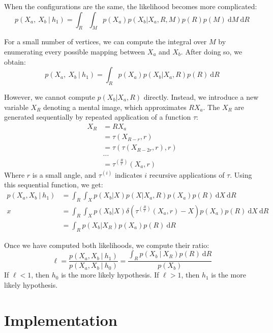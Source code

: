 \documentclass{article} %
\begin{document}
When the configurations are the same, the likelihood becomes more
complicated:
\begin{equation} 
  p(X_a,\ X_b\ \vert \ h_1)=\int_R\int_M p(X_a) p(X_b\vert X_a,R,M) p(R) p(M)\ \mathrm{d}M\ \mathrm{d}R
\end{equation}

For a small number of vertices, we can compute the integral over $M$
by enumerating every possible mapping between $X_a$ and $X_b$. After
doing so, we obtain:
\begin{equation} 
  p(X_a,\ X_b\ \vert \ h_1)=\int_R p(X_a) p(X_b\vert X_a,R) p(R)\ \mathrm{d}R
\end{equation}

However, we cannot compute $p(X_b\vert X_a, R)$ directly. Instead, we
introduce a new variable $X_R$ denoting a mental image, which
approximates $RX_a$. The $X_R$ are generated sequentially by repeated
application of a function $\tau$:
\begin{align}
  X_R&=RX_a\nonumber \\
  &=\tau(X_{R-r}, r)\nonumber \\
  &=\tau(\tau(X_{R-2r}, r), r)\nonumber \\
  &\ldots{}\nonumber \\
  &=\tau^{(\frac{R}{r})}(X_a, r)
  \label{eq:tau}
\end{align} 
Where $r$ is a small angle, and $\tau^{(i)}$ indicates $i$ recursive
applications of $\tau$. Using this sequential function, we get:
\begin{align}
  p(X_a, X_b\ \vert \ h_1)&=\int_R \int_{X} p(X_b\vert X) p(X\vert X_a, R)p(X_a)p(R)\ \mathrm{d}X\ \mathrm{d}R \nonumber \\
  x&= \int_R \int_X p(X_b\vert X)\delta(\tau^{(\frac{R}{r})}(X_a, r)-X)p(X_a)p(R)\ \mathrm{d}X\ \mathrm{d}R \nonumber \\
  &= \int_R p(X_b\vert X_R)p(X_a)p(R)\ \mathrm{d}R
  \label{eq:lh-h1}
\end{align}

Once we have computed both likelihoods, we compute their ratio:
\begin{equation}
  \ell=\frac{p(X_a, X_b\ \vert \ h_1)}{p(X_a, X_b\ \vert \ h_0)}=\frac{\int_R p(X_b\ \vert\ X_R)p(R)\ \mathrm{d}R}{p(X_b)}
  \label{eq:lh-ratio}
\end{equation}
If $\ell<1$, then $h_0$ is the more likely hypothesis. If $\ell>1$,
then $h_1$ is the more likely hypothesis.

\section{Implementation}
\end{document}
